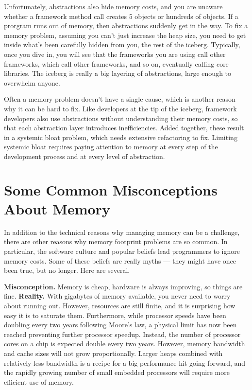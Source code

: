 Unfortunately, abstractions also hide memory costs, and
 you are unaware whether a framework method call creates 5 objects 
or hundreds of objects. If a prorgram runs out of memory,
then abstractions suddenly get in the way. To fix a memory problem, assuming
you can't just increase the heap size, you need to get inside what's been
carefully hidden from you, the rest of the iceberg. Typically, once you dive in,
you will see that the frameworks you are using call
other frameworks, which call other frameworks, and so on, eventually calling
core libraries. The iceberg is really a big layering of abstractions, large
enough to overwhelm anyone. 

Often a memory problem doesn't have a single cause, which is another reason why
it can be hard to fix. Like developers at the tip of the iceberg, framework
developers also use abstractions without understanding their memory costs, so
that each abstraction layer introduces inefficiencies. Added together, these  
result in a systemic bloat problem, which needs extensive refactoring to
fix. Limiting systemic bloat requires paying attention to memory
 at every step of the development process and at every level of abstraction.


\section{Some Common Misconceptions About Memory}

In addition to the technical reasons why managing memory can be a challenge, there
are other reasons why memory footprint problems are so common. In particular,
the software culture and popular beliefs lead programmers to ignore memory
costs. Some of these beliefs are really myths --- they might have once
been true, but no longer. Here are several.

\textbf{Misconception.} Memory is cheap, hardware is always improving, so
things are fine. \textbf{Reality.} With gigabytes of memory available, you never
need to worry about running out. However, resources are still finite, and it is surprising how easy it is to
saturate them. Furthermore, while processor speeds have been doubling every two
years following Moore's law, a physical limit has now been reached preventing further processor speedup. 
Instead, the number of processor cores on a chip is expected double every two years. However,
memory bandwidth and cache sizes will not grow proportionally. 
 Larger heaps combined with relatively less bandwidth is a recipe for a big performance hit going forward, 
 and the rapidly growing number of small embedded processors will require more
 efficient use of memory.

